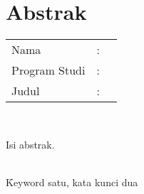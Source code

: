 %
%
%

\chapter*{Abstrak}

\vspace*{0.2cm}

\noindent \begin{tabular}{l l p{10cm}}
	Nama&: & \penulis \\
	Program Studi&: & \program \\
	Judul&: & \judul \\
\end{tabular} \\

\vspace*{0.5cm}

\noindent Isi abstrak. \\

\vspace*{0.2cm}

\noindent {} \\ \f{Keyword} satu, kata kunci dua \\

\newpage
